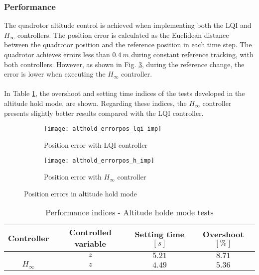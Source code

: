 \subsubsection{Performance}
The quadrotor altitude control is achieved when implementing both the LQI and $H_\infty$ controllers.
The position error is calculated as the Euclidean distance between the quadrotor position and the reference position in each time step. The quadrotor achieves errors less than $0.4\ m$ during constant reference tracking, with both controllers. However, as shown in Fig. \ref{fig:althold_errorpos_imp}, during the reference change, the error is lower when executing the $H_\infty$ controller.
\\\\
In Table \ref{tb:althold_index}, the overshoot and setting time indices of the tests developed in the altitude hold mode, are shown. Regarding these indices, the $H_\infty$ controller presents slightly better results compared with the LQI controller.
\begin{figure}[hh]
\begin{subfigure}{.5\linewidth}
\centering
\texttt{[image: althold\_errorpos\_lqi\_imp]}
\caption{Position error with LQI controller}
\label{fig:althold_errorpos_lqi_imp}
\end{subfigure}%
\begin{subfigure}{.5\linewidth}
\centering
\texttt{[image: althold\_errorpos\_h\_imp]}
\caption{Position error with $H_\infty$ controller}
\label{fig:althold_errorpos_h_imp}
\end{subfigure}
\caption{Position errors in altitude hold mode}
\label{fig:althold_errorpos_imp}
\end{figure}
\begin{table}[h]
\small
\begin{center}
\caption{Performance indices - Altitude holde mode tests}\label{tb:althold_index}
\begin{tabular}{c|c|c|c}\hline
\rule{0pt}{3ex} Controller & Controlled variable & Setting time $[s]$ & Overshoot $[\%]$ \\\hline\hline
\rule{0pt}{3ex} 
\multirow{1}{*}{LQI} 
 & $z$ & $5.21$ & $8.71$ \\ \hline
\multirow{1}{*}{$H_\infty$} 
 & $z$ & $4.49$ & $5.36$ \\ \hline\hline
\end{tabular}
\end{center}
\end{table}
\\\\
